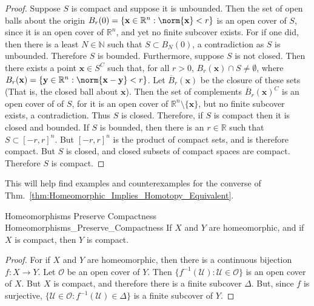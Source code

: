\documentclass[crop=false,class=book,oneside]{standalone}                      %
\begin{document}
            \begin{proof}
                Suppose $S$ is compact and suppose it is unbounded. Then the
                set of open balls about the origin
                $B_{r}(0)=\{\mathbf{x}\in\mathbb{R}^{n}:\norm{\mathbf{x}}<r\}$
                is an open cover of $S$, since it is an open cover of
                $\mathbb{R}^{n}$, and yet no finite subcover exists. For if
                one did, then there is a least $N\in\mathbb{N}$ such that
                $S\subset{B_{N}(0)}$, a contradiction as $S$ is unbounded.
                Therefore $S$ is bounded. Furthermore, suppose $S$ is
                not closed. Then there exists a point $\mathbf{x}\in{S^{C}}$
                such that, for all $r>0$,
                $B_{r}(\mathbf{x})\cap{S}\ne\emptyset$, where
                $B_{r}(\mathbf{x})=\{\mathbf{y}\in\mathbb{R}^{n}:%
                 \norm{\mathbf{x}-\mathbf{y}}<r\}$.
                Let $\overline{B}_{r}(\mathbf{x})$ be the closure of these sets
                (That is, the closed ball about $\mathbf{x}$). Then the set of
                complements $\overline{B}_{r}(\mathbf{x})^{C}$ is an open cover
                of of $S$, for it is an open cover of
                $\mathbb{R}^{n}\setminus\{\mathbf{x}\}$, but no finite subcover
                exists, a contradiction. Thus $S$ is closed. Therefore, if $S$
                is compact then it is closed and bounded. If $S$ is bounded,
                then there is an $r\in\mathbb{R}$ such that
                $S\subset[-r,r]^{n}$. But $[-r,r]^{n}$ is the product of compact
                sets, and is therefore compact. But $S$ is closed, and closed
                subsets of compact spaces are compact. Therefore $S$ is compact.
            \end{proof}
            This will help find examples and counterexamples for the converse of
            Thm.~\ref{thm:Homeomorphic_Implies_Homotopy_Equivalent}.
            \begin{ltheorem}{Homeomorphisms Preserve Compactness}
                            {Homeomorphisms_Preserve_Compactness}
                If $X$ and $Y$ are homeomorphic, and if $X$ is compact,
                then $Y$ is compact.
            \end{ltheorem}
            \begin{proof}
                For if $X$ and $Y$ are homeomorphic, then there
                is a continuous bijection $f:X\rightarrow{Y}$.
                Let $\mathcal{O}$ be an open cover of $Y$.
                Then $\{f^{-1}(\mathcal{U}):\mathcal{U}\in\mathcal{O}\}$
                is an open cover of $X$. But $X$ is compact, and therefore
                there is a finite subcover $\Delta$. But, since $f$ is
                surjective,
                $\{\mathcal{U}\in\mathcal{O}:f^{-1}(\mathcal{U})\in\Delta\}$
                is a finite subcover of $Y$.
            \end{proof}
\end{document}
